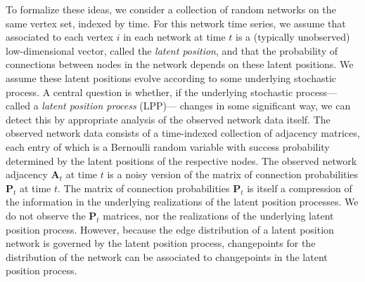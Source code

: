 \documentclass[12pt]{article}
\theoremstyle{definition}
\newcommand{\bA}{\mathbf{A}}
\newcommand{\bP}{\mathbf{P}}
\begin{document}
To formalize these ideas, we consider a collection of random networks on the same vertex set, indexed by time. For this network time series, we assume that associated to each vertex $i$ in each network at time $t$ is a (typically unobserved) low-dimensional vector, called the {\em latent position}, and that the probability of connections between nodes in the network depends on these latent positions. We assume these latent positions evolve according to some underlying stochastic process. A central question is whether, if the underlying stochastic process---called a {\em latent position process} (LPP)---
changes in some significant way, we can detect this by appropriate analysis of the observed network data itself. The observed network data consists of a time-indexed collection of adjacency matrices, each entry of which is a Bernoulli random variable with success probability determined by the latent positions of the respective nodes. The observed network adjacency $\bA_t$ at time $t$ is a noisy version of the matrix of connection probabilities $\bP_t$ at time $t$. The matrix of connection probabilities $\bP_t$ is itself a compression of the information in the underlying realizations of the latent position processes. We do not observe the $\bP_t$ matrices, nor the realizations of the underlying latent position process. However, because the edge distribution of a latent position network is governed by the latent position process, changepoints for the distribution of the network can be associated to changepoints in the latent position process.
\end{document}
